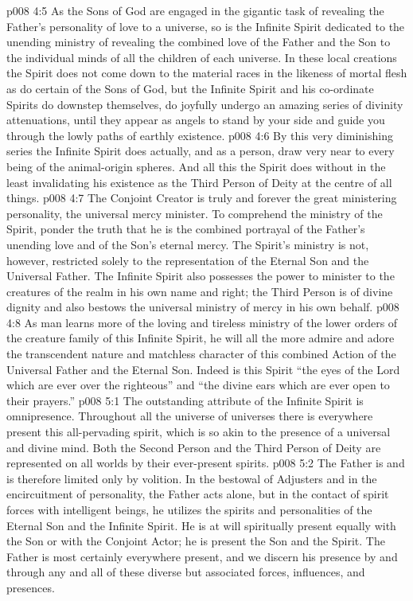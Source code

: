 \vs p008 4:5 As the Sons of God are engaged in the gigantic task of revealing the Father’s personality of love to a universe, so is the Infinite Spirit dedicated to the unending ministry of revealing the combined love of the Father and the Son to the individual minds of all the children of each universe. In these local creations the Spirit does not come down to the material races in the likeness of mortal flesh as do certain of the Sons of God, but the Infinite Spirit and his co\hyp{}ordinate Spirits do downstep themselves, do joyfully undergo an amazing series of divinity attenuations, until they appear as angels to stand by your side and guide you through the lowly paths of earthly existence.
\vs p008 4:6 By this very diminishing series the Infinite Spirit does actually, and as a person, draw very near to every being of the animal\hyp{}origin spheres. And all this the Spirit does without in the least invalidating his existence as the Third Person of Deity at the centre of all things.
\vs p008 4:7 \pc The Conjoint Creator is truly and forever the great ministering personality, the universal mercy minister. To comprehend the ministry of the Spirit, ponder the truth that he is the combined portrayal of the Father’s unending love and of the Son’s eternal mercy. The Spirit’s ministry is not, however, restricted solely to the representation of the Eternal Son and the Universal Father. The Infinite Spirit also possesses the power to minister to the creatures of the realm in his own name and right; the Third Person is of divine dignity and also bestows the universal ministry of mercy in his own behalf.
\vs p008 4:8 As man learns more of the loving and tireless ministry of the lower orders of the creature family of this Infinite Spirit, he will all the more admire and adore the transcendent nature and matchless character of this combined Action of the Universal Father and the Eternal Son. Indeed is this Spirit “the eyes of the Lord which are ever over the righteous” and “the divine ears which are ever open to their prayers.”
\vs p008 5:1 The outstanding attribute of the Infinite Spirit is omnipresence. Throughout all the universe of universes there is everywhere present this all\hyp{}pervading spirit, which is so akin to the presence of a universal and divine mind. Both the Second Person and the Third Person of Deity are represented on all worlds by their ever\hyp{}present spirits.
\vs p008 5:2 The Father is  and is therefore limited only by volition. In the bestowal of Adjusters and in the encircuitment of personality, the Father acts alone, but in the contact of spirit forces with intelligent beings, he utilizes the spirits and personalities of the Eternal Son and the Infinite Spirit. He is at will spiritually present equally with the Son or with the Conjoint Actor; he is present  the Son and  the Spirit. The Father is most certainly everywhere present, and we discern his presence by and through any and all of these diverse but associated forces, influences, and presences.
